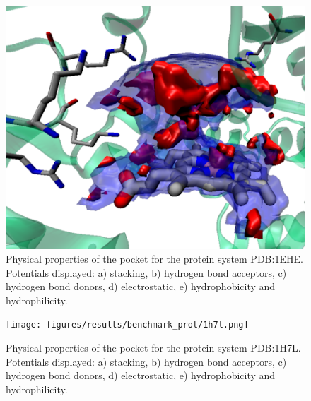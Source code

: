     \begin{figure}[H]
      \centering
      \includegraphics[width=1\textwidth]{figures/results/benchmark_prot/1ehe.png}
      \caption{\label{fig:benchmark/1ehe} Physical properties of the pocket for the protein system PDB:1EHE. Potentials displayed: a) stacking, b) hydrogen bond acceptors, c) hydrogen bond donors, d) electrostatic, e) hydrophobicity and hydrophilicity.}
    \end{figure}

    \begin{figure}[H]
      \centering
      \texttt{[image: figures/results/benchmark\_prot/1h7l.png]}
      \caption{\label{fig:benchmark/1h7l} Physical properties of the pocket for the protein system PDB:1H7L. Potentials displayed: a) stacking, b) hydrogen bond acceptors, c) hydrogen bond donors, d) electrostatic, e) hydrophobicity and hydrophilicity.}
    \end{figure}

